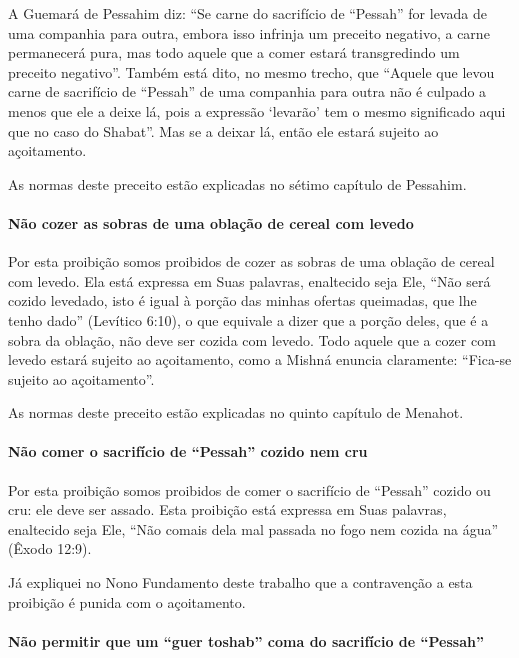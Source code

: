 A Guemará de Pessahim diz: ``Se carne do sacrifício de ``Pessah'' for
levada de uma companhia para outra, embora isso
infrinja um preceito negativo, a carne permanecerá pura, mas todo aquele
que a comer estará transgredindo um preceito negativo''. Também está
dito, no mesmo trecho, que ``Aquele que levou carne de sacrifício de
``Pessah'' de uma companhia para outra não é
culpado a menos que ele a deixe lá, pois a expressão `levarão' tem o
mesmo significado aqui que no caso do Shabat''. Mas se a deixar lá,
então ele estará sujeito ao açoitamento.

As normas deste preceito estão explicadas no sétimo capítulo de Pessahim.

\paragraph{Não cozer as sobras de uma oblação de cereal com levedo}

Por esta proibição somos proibidos de cozer as sobras de uma oblação de
cereal com levedo. Ela está expressa em Suas palavras, enaltecido seja
Ele, ``Não será cozido levedado, isto é igual à porção das minhas
ofertas queimadas, que lhe tenho dado'' (Levítico 6:10), o que equivale
a dizer que a porção deles, que é a sobra da oblação, não deve ser
cozida com levedo. Todo aquele que a cozer com levedo estará sujeito ao
açoitamento, como a Mishná enuncia claramente: ``Fica-se sujeito ao
açoitamento''.

As normas deste preceito estão explicadas no quinto capítulo de Menahot.

\paragraph{Não comer o sacrifício de ``Pessah'' cozido nem cru}

Por esta proibição somos proibidos de comer o sacrifício de ``Pessah''
cozido ou cru: ele deve ser assado. Esta proibição está expressa em Suas
palavras, enaltecido seja Ele, ``Não comais dela mal passada no fogo nem
cozida na água'' (Êxodo 12:9).

Já expliquei no Nono Fundamento deste trabalho que a contravenção a
esta proibição é punida com o açoitamento.

\paragraph{Não permitir que um ``guer toshab'' coma do sacrifício de ``Pessah''}

